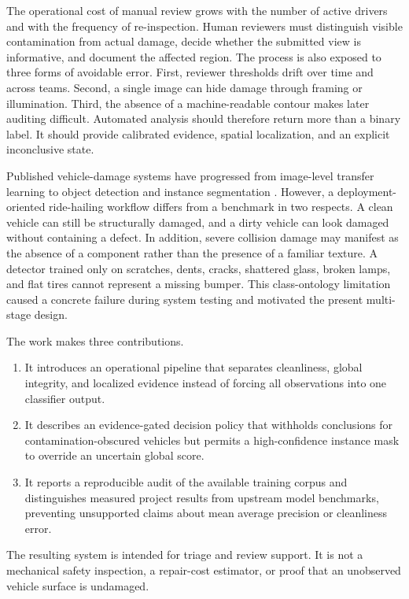 \documentclass[conference]{IEEEtran}
\begin{document}
The operational cost of manual review grows with the number of active drivers and with the frequency of re-inspection. Human reviewers must distinguish visible contamination from actual damage, decide whether the submitted view is informative, and document the affected region. The process is also exposed to three forms of avoidable error. First, reviewer thresholds drift over time and across teams. Second, a single image can hide damage through framing or illumination. Third, the absence of a machine-readable contour makes later auditing difficult. Automated analysis should therefore return more than a binary label. It should provide calibrated evidence, spatial localization, and an explicit inconclusive state.

Published vehicle-damage systems have progressed from image-level transfer learning to object detection and instance segmentation \cite{patil2017,dhieb2019,dwivedi2021,wang2023cardd}. However, a deployment-oriented ride-hailing workflow differs from a benchmark in two respects. A clean vehicle can still be structurally damaged, and a dirty vehicle can look damaged without containing a defect. In addition, severe collision damage may manifest as the absence of a component rather than the presence of a familiar texture. A detector trained only on scratches, dents, cracks, shattered glass, broken lamps, and flat tires cannot represent a missing bumper. This class-ontology limitation caused a concrete failure during system testing and motivated the present multi-stage design.

The work makes three contributions.

\begin{enumerate}
    \item It introduces an operational pipeline that separates cleanliness, global integrity, and localized evidence instead of forcing all observations into one classifier output.
    \item It describes an evidence-gated decision policy that withholds conclusions for contamination-obscured vehicles but permits a high-confidence instance mask to override an uncertain global score.
    \item It reports a reproducible audit of the available training corpus and distinguishes measured project results from upstream model benchmarks, preventing unsupported claims about mean average precision or cleanliness error.
\end{enumerate}

The resulting system is intended for triage and review support. It is not a mechanical safety inspection, a repair-cost estimator, or proof that an unobserved vehicle surface is undamaged.
\end{document}
